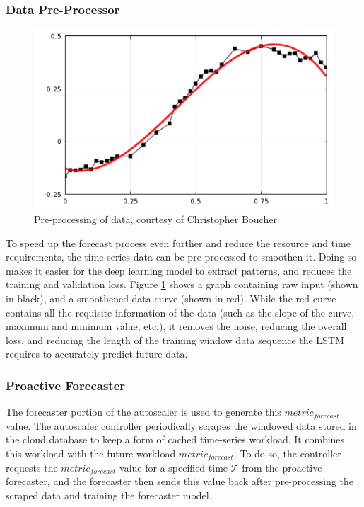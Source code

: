 \subsubsection{Data Pre-Processor}
\label{subsubsec:ch4-data-pre-process}

\begin{figure}[htb]
    \centering
    \caption{Pre-processing of data, courtesy of Christopher Boucher \cite{comsolcurvefitting}}
    \label{fig:data-pre-process}
    \includegraphics[width=0.6\linewidth]{Figures/Data-Pre-Processing.pdf}
\end{figure}

To speed up the forecast process even further and reduce the resource and time requirements, the time-series data can be pre-processed to smoothen it. Doing so makes it easier for the deep learning model to extract patterns, and reduces the training and validation loss. Figure \ref{fig:data-pre-process} shows a graph containing raw input (shown in black), and a smoothened data curve (shown in red). While the red curve contains all the requisite information of the data (such as the slope of the curve, maximum and minimum value, etc.), it removes the noise, reducing the overall loss, and reducing the length of the training window data sequence the LSTM requires to accurately predict future data.\par

\subsubsection{Proactive Forecaster}

The forecaster portion of the autoscaler is used to generate this $metric_{forecast}$ value. The autoscaler controller periodically scrapes the windowed data stored in the cloud database to keep a form of cached time-series workload. It combines this workload with the future workload $metric_{forecast}$. To do so, the controller requests the $metric_{forecast}$ value for a specified time $\mathcal{T}$ from the proactive forecaster, and the forecaster then sends this value back after pre-processing the scraped data and training the forecaster model.\par

